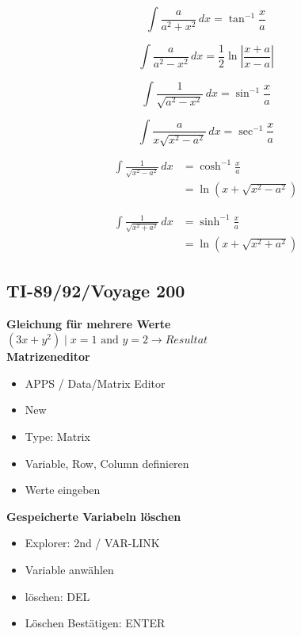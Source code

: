 \documentclass[a4paper]{scrartcl}
\newcommand{\dx}{\hspace{2pt}dx}
\begin{document}
\begin{center}
\begin{multicols}{2}
\begin{equation}
\int \frac{a}{a^2+x^2}\dx = \tan^{-1}\frac{x}{a}
\end{equation}

\begin{equation}
\int \frac{a}{a^2-x^2}\dx = \frac{1}{2}\ln\left|\frac{x+a}{x-a}\right|
\end{equation}

\begin{equation}
\int \frac{1}{\sqrt{a^2-x^2}} \dx = \sin^{-1} \frac{x}{a}
\end{equation}

\begin{equation}
\int \frac{a}{x \sqrt{x^2-a^2}} \dx = \sec^{-1} \frac{x}{a}
\end{equation}

\begin{align}
\int \frac{1}{\sqrt{x^2-a^2}} \dx &= \cosh^{-1} \frac{x}{a} \\&= \nonumber \ln (x+\sqrt{x^2-a^2})
\end{align}

\begin{align}
\int \frac{1}{\sqrt{x^2+a^2}} \dx &= \sinh^{-1} \frac{x}{a} \\&=\nonumber \ln (x+\sqrt{x^2+a^2})
\end{align}

\end{multicols}
\end{center}		
		

		
	\subsection{TI-89/92/Voyage 200}
		\textbf{Gleichung für mehrere Werte}\\
		$(3x+y^2) \mid x=1 \text{ and } y=2 \to Resultat$\\
		\textbf{Matrizeneditor}
		\begin{itemize}
			 \item APPS / Data/Matrix Editor
			 \item New
			 \item Type: Matrix
			 \item Variable, Row, Column definieren
			 \item Werte eingeben
		\end{itemize}
			
		\textbf{Gespeicherte Variabeln löschen}
		\begin{itemize}
		\item Explorer: 2nd / VAR-LINK
		\item Variable anwählen
		\item löschen: DEL
		\item Löschen Bestätigen: ENTER
		\end{itemize}
		
\end{document}
